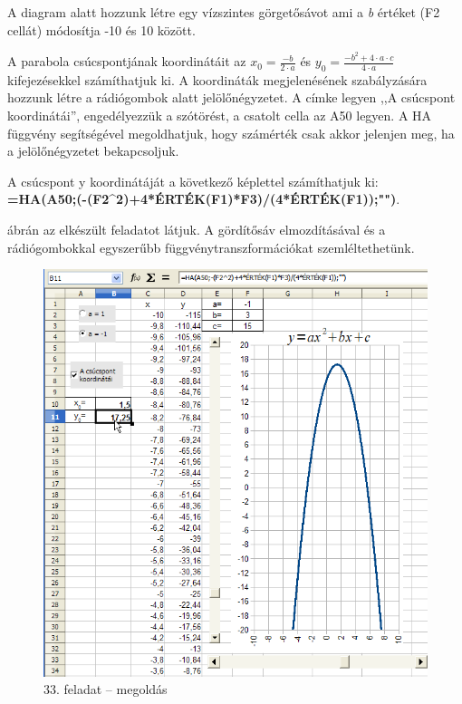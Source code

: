 A diagram alatt hozzunk létre egy vízszintes görgetősávot
ami a \textit{b }értéket (F2 cellát) módosítja -10 és 10
között.

A parabola csúcspontjának koordinátáit az 
$x_{0}=\frac{-{b}}{2\cdot a}$ és  $y_{0}=\frac{-b^{2}+4\cdot a\cdot
c}{4\cdot a}$ kifejezésekkel számíthatjuk ki. A koordináták
megjelenésének szabályzására hozzunk létre a
rádiógombok alatt jelölőnégyzetet. A címke legyen
,,A csúcspont koordinátái'',
engedélyezzük a szótörést, a csatolt cella az A50 legyen. A
HA függvény segítségével megoldhatjuk, hogy számérték
csak akkor jelenjen meg, ha a jelölőnégyzetet bekapcsoljuk.

A csúcspont y koordinátáját a következő képlettel
számíthatjuk ki:\\
{\sffamily\bfseries{=HA(A50;(-(F2\^{}2)+4*ÉRTÉK(F1)*F3)/(4*ÉRTÉK(F1));"")}}.

 ábrán az elkészült feladatot látjuk. A
gördítősáv elmozdításával és a rádiógombokkal
egyszerűbb függvénytranszformációkat szemléltethetünk.

\begin{figure}[!h]
\begin{center}
\includegraphics[width=15.999cm]{oocalcv2-img156.png}
\caption{33. feladat --  megoldás}\label{33-feladatMegoldás}
\end{center}
\end{figure}

